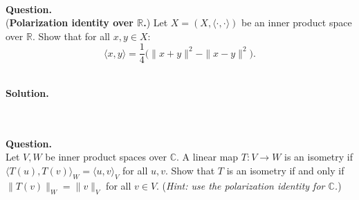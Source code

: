 \documentclass{article}
\begin{document}
\bigskip

\hfill \break  $~\!\!$ \dotfill \medskip \\
\textbf{Question.}\\
(\textbf{Polarization identity over $\mathbb{R}$.}) Let $X = (X, \langle \cdot, \cdot \rangle)$ be an inner product space over $\mathbb{R}$. Show that for all $x, y \in X$:
\[
\langle x, y \rangle = \frac{1}{4}\bigl(\|x+y\|^2 - \|x-y\|^2\bigr).
\]

\noindent\\
\textbf{Solution.}\\
\quad\\
\noindent{}

\bigskip

\hfill \break  $~\!\!$ \dotfill \medskip \\
\textbf{Question.}\\
Let $V, W$ be inner product spaces over $\mathbb{C}$. A linear map $T: V \to W$ is an isometry if $\langle T(u), T(v) \rangle_W = \langle u, v \rangle_V$ for all $u, v$. Show that $T$ is an isometry if and only if $\|T(v)\|_W = \|v\|_V$ for all $v \in V$.
(\textit{Hint: use the polarization identity for $\mathbb{C}$.})
\end{document}
